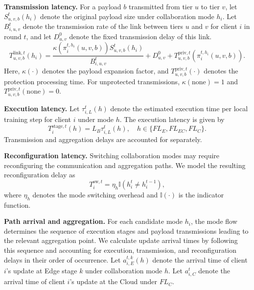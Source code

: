 \documentclass[5p,times]{elsarticle}
\theoremstyle{plain}
\theoremstyle{definition}
\theoremstyle{remark}
\begin{document}
\textbf{Transmission latency.}
For a payload \(b\) transmitted from tier \(u\)
to tier \(v\), let \(S_{u,v,b}^t(h_i)\) denote
the original payload size under collaboration
mode \(h_i\). Let \(B_{i,u,v}^t\) denote
the transmission rate of the link between
tiers \(u\) and \(v\) for client \(i\) in
round \(t\), and let \(D_{u,v}^{0}\) denote
the fixed transmission delay of this link.
\begin{equation}
T_{u,v,b}^{\mathrm{link},t}(h_i)
=
\frac{
\kappa\!\left(\pi_i^{t,h_i}(u,v,b)\right)
S_{u,v,b}^t(h_i)}
{B_{i,u,v}^t}
+
D_{u,v}^{0}
+
T_{u,v,b}^{\mathrm{priv},t}
\!\left(\pi_i^{t,h_i}(u,v,b)\right).
\label{eq:comm_latency}
\end{equation}
Here, \(\kappa(\cdot)\) denotes the payload
expansion factor, and
\(T_{u,v,b}^{\mathrm{priv},t}(\cdot)\)
denotes the protection processing time.
For unprotected transmissions,
\(\kappa(\mathrm{none})=1\) and
\(T_{u,v,b}^{\mathrm{priv},t}(\mathrm{none})=0\).


\textbf{Execution latency.}
Let \(\tau_{i,L}^t(h)\) denote the estimated
execution time per local training step for
client \(i\) under mode \(h\).
The execution latency is given by
\begin{equation}
T_i^{\mathrm{stage},t}(h)
=
L_B\tau_{i,L}^t(h),
\quad
h\in\{FL_E,FL_{EC},FL_C\}.
\label{eq:execution_latency}
\end{equation}
Transmission and aggregation delays are
accounted for separately.

\textbf{Reconfiguration latency.}
Switching collaboration modes may require
reconfiguring the communication and aggregation
paths. We model the resulting reconfiguration
delay as
\begin{equation}
T_i^{\mathrm{sw},t}
=
\eta_h \mathbb{I}(h_i^t\neq h_i^{t-1}),
\label{eq:switching_cost}
\end{equation}
where \(\eta_h\) denotes the mode switching
overhead and \(\mathbb{I}(\cdot)\) is the
indicator function.

\textbf{Path arrival and aggregation.}
For each candidate mode \(h_i\), the mode flow
determines the sequence of execution stages
and payload transmissions leading to the
relevant aggregation point.
We calculate update arrival times by
following this sequence and accounting for
execution, transmission, and reconfiguration
delays in their order of occurrence.
Let \(a_{i,E}^{t,k}(h)\) denote the arrival time
of client \(i\)'s update at Edge stage \(k\)
under collaboration mode \(h\). Let \(a_{i,C}^t\)
denote the arrival time of client \(i\)'s update
at the Cloud under \(FL_C\).
\end{document}
